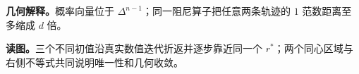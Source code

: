 \documentclass[UTF8,a4paper,11pt,openany]{ctexbook}
\begin{document}
\setcounter{page}{905}
\setcounter{chapter}{36}
\setcounter{section}{3}
\setcounter{figure}{5}
\pagestyle{headings}
\textbf{几何解释。}概率向量位于 $\Delta^{n-1}$；同一阻尼算子把任意两条轨迹的 $1$ 范数距离至多缩成 $d$ 倍。

\FloatBarrier
\textbf{读图。}三个不同初值沿真实数值迭代折返并逐步靠近同一个 $r^*$；两个同心区域与右侧不等式共同说明唯一性和几何收敛。
\end{document}
